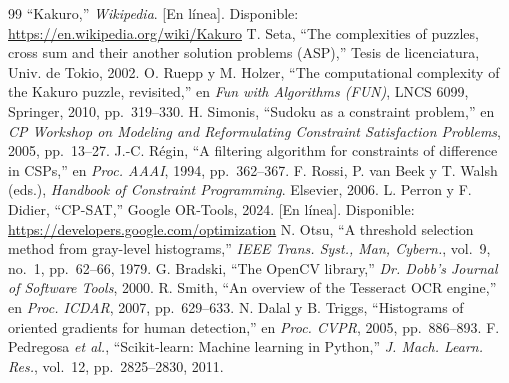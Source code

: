 \documentclass[conference,a4paper]{IEEEtran}\def\HAVEIEEE{1}%
\begin{document}
\begin{thebibliography}{99}
 ``Kakuro,'' \emph{Wikipedia}. [En línea]. Disponible: \url{https://en.wikipedia.org/wiki/Kakuro}
 T. Seta, ``The complexities of puzzles, cross sum and their another solution problems (ASP),'' Tesis de licenciatura, Univ. de Tokio, 2002.
 O. Ruepp y M. Holzer, ``The computational complexity of the Kakuro puzzle, revisited,'' en \emph{Fun with Algorithms (FUN)}, LNCS 6099, Springer, 2010, pp.~319--330.
 H. Simonis, ``Sudoku as a constraint problem,'' en \emph{CP Workshop on Modeling and Reformulating Constraint Satisfaction Problems}, 2005, pp.~13--27.
 J.-C. Régin, ``A filtering algorithm for constraints of difference in CSPs,'' en \emph{Proc. AAAI}, 1994, pp.~362--367.
 F. Rossi, P. van Beek y T. Walsh (eds.), \emph{Handbook of Constraint Programming}. Elsevier, 2006.
 L. Perron y F. Didier, ``CP-SAT,'' Google OR-Tools, 2024. [En línea]. Disponible: \url{https://developers.google.com/optimization}
 N. Otsu, ``A threshold selection method from gray-level histograms,'' \emph{IEEE Trans. Syst., Man, Cybern.}, vol.~9, no.~1, pp.~62--66, 1979.
 G. Bradski, ``The OpenCV library,'' \emph{Dr. Dobb's Journal of Software Tools}, 2000.
 R. Smith, ``An overview of the Tesseract OCR engine,'' en \emph{Proc. ICDAR}, 2007, pp.~629--633.
 N. Dalal y B. Triggs, ``Histograms of oriented gradients for human detection,'' en \emph{Proc. CVPR}, 2005, pp.~886--893.
 F. Pedregosa \emph{et al.}, ``Scikit-learn: Machine learning in Python,'' \emph{J. Mach. Learn. Res.}, vol.~12, pp.~2825--2830, 2011.
\end{thebibliography}
\end{document}
